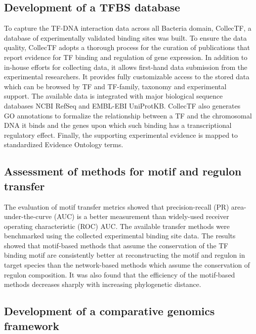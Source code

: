 \documentclass[12pt]{article}
\begin{document}
\subsection{Development of a TFBS database}

To capture the TF-DNA interaction data across all Bacteria domain, CollecTF, a
database of experimentally validated binding sites was built. To ensure the
data quality, CollecTF adopts a thorough process for the curation of
publications that report evidence for TF binding and regulation of gene
expression. In addition to in-house efforts for collecting data, it allows
first-hand data submission from the experimental researchers. It provides fully
customizable access to the stored data which can be browsed by TF and
TF-family, taxonomy and experimental support. The available data is integrated
with major biological sequence databases NCBI RefSeq and EMBL-EBI
UniProtKB\-. CollecTF also generates GO annotations to formalize the relationship
between a TF and the chromosomal DNA it binds and the genes upon which such
binding has a transcriptional regulatory effect. Finally, the supporting experimental
evidence is mapped to standardized Evidence Ontology terms.

\subsection{Assessment of methods for motif and regulon transfer}

The evaluation of motif transfer metrics showed that precision-recall (PR)
area-under-the-curve (AUC) is a better measurement than widely-used receiver
operating characteristic (ROC) AUC\@. The available transfer methods were
benchmarked using the collected experimental binding site data. The results
showed that motif-based methods that assume the conservation of the TF binding
motif are consistently better at reconstructing the motif and regulon in target
species than the network-based methods which assume the conservation of regulon
composition. It was also found that the efficiency of the motif-based methods
decreases sharply with increasing phylogenetic distance.

\subsection{Development of a comparative genomics framework}
\end{document}
